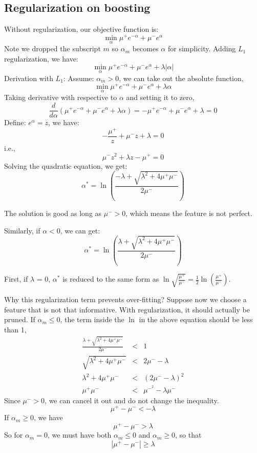 \documentclass[]{article}  %
\begin{document}
\subsection{Regularization on boosting}
Without regularization, our objective function is:
\[
\min_{\alpha} \mu^+ e^{-\alpha} + \mu^-e^\alpha
\]
Note we dropped the subscript $m$ so $\alpha_m$ becomes $\alpha$ for simplicity. 
Adding $L_1$ regularization, we have:
\[
\min_{\alpha} \mu^+ e^{-\alpha} + \mu^-e^\alpha + \lambda|\alpha|
\]
Derivation with $L_1$:
Assume: $\alpha_m > 0$, we can take out the absolute function, 
\[
\min_{\alpha} \mu^+ e^{-\alpha} + \mu^-e^\alpha + \lambda \alpha
\]
Taking derivative with respective to $\alpha$ and setting it to zero, 
\[
\frac{d}{d\alpha} (\mu^+ e^{-\alpha} + \mu^-e^\alpha + \lambda \alpha) = -\mu^+e^{-\alpha} + \mu^-e^\alpha + \lambda = 0
\]
Define: $e^\alpha = z$, we have:
\[
-\frac{\mu^+}{z} + \mu^-z + \lambda = 0
\]
i.e., 
\[
\mu^-z^2 + \lambda z - \mu^+ = 0
\]
Solving the quadratic equation, we get:
\[
\alpha^* =  \ln\left(\frac{-\lambda + \sqrt{\lambda^2+4\mu^+\mu^-}}{2\mu^-} \right)
\]

The solution is good as long as $\mu^- > 0$, which means the feature is not perfect. 

Similarly, if $\alpha < 0$, we can get:
\[
\alpha^* =  \ln\left(\frac{\lambda + \sqrt{\lambda^2+4\mu^+\mu^-}}{2\mu^-} \right)
\]

First, if $\lambda$ = 0, $\alpha^*$ is reduced to the same form as $\ln \sqrt{\frac{\mu^+}{\mu^-}} = \frac{1}{2}\ln \left(\frac{\mu^+}{\mu^-}\right)$.

Why this regularization term prevents over-fitting? Suppose now we choose a feature that is not that informative. With regularization, it should actually be pruned. 
If $\alpha_m \leq 0$, the term inside the $\ln$ in the above equation should be less than 1, 
\begin{eqnarray*}
\frac{\lambda + \sqrt{\lambda^2+4\mu^+\mu^-}}{2\mu^-} &<& 1\\
\sqrt{\lambda^2+4\mu^+\mu^-} &<&  2\mu^- - \lambda\\
\lambda^2+4\mu^+\mu^- &<& (2\mu^--\lambda)^2\\
\mu^+ \mu^- &<& \mu^{-^2} - \lambda \mu^-
\end{eqnarray*}
Since $\mu^- > 0$, we can cancel it out and do not change the inequality.
\[
\mu^+ - \mu^- < -\lambda
\]
If $\alpha_m \geq 0$, we have 
\[
\mu^+ - \mu^- > \lambda
\]
So for $\alpha_m = 0$, we must have both $\alpha_m \leq 0 $ and $\alpha_m \geq 0$, so that
\[
|\mu^+ - \mu^-| \geq \lambda
\]
\end{document}
